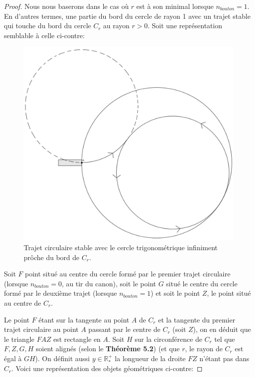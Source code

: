 \documentclass{amsart}
\theoremstyle{definition}
\theoremstyle{remark}
\numberwithin{equation}{section}
\begin{document}
\begin{proof}
  Nous nous baserons dans le cas où $r$ est à son minimal lorsque $n_{bouton}=1$. En d'autres termes, une partie du bord du cercle de rayon 1 avec un trajet stable qui touche du bord du cercle $C_r$ au rayon $r>0$. Soit une représentation
  semblable à celle ci-contre:

  \begin{figure}[H]
    \centering
    \includegraphics[scale=0.15]{images/perfect_inside.png}
    \caption{Trajet circulaire stable avec le cercle trigonométrique infiniment prôche du bord de $C_r$.}
  \end{figure}

  Soit $F$ point situé au centre du cercle formé par le premier trajet circulaire (lorsque $n_{bouton}=0$, au tir du canon), soit le point $G$ situé le centre
  du cercle formé par le deuxième trajet (lorsque $n_{bouton}=1$) et soit le point $Z$, le point situé au centre de $C_r$.

  Le point $F$ étant sur la tangente au point $A$ de $C_r$ et la tangente du premier trajet circulaire au point $A$ passant par le centre de $C_r$ (soit $Z$), on en déduit que
  le triangle $FAZ$ est rectangle en $A$. Soit $H$ sur la circonférence de $C_r$ tel que $F,Z,G,H$ soient alignés (selon le \textbf{Théorème 5.2}) (et que $r$, le rayon de $C_r$ est égal à $GH$). On définit aussi $y\in\mathbb{R^+_*}$ la longueur de la droite $FZ$ n'étant pas dans $C_r$. Voici une représentation des objets géométriques ci-contre:


\end{proof}
\end{document}
